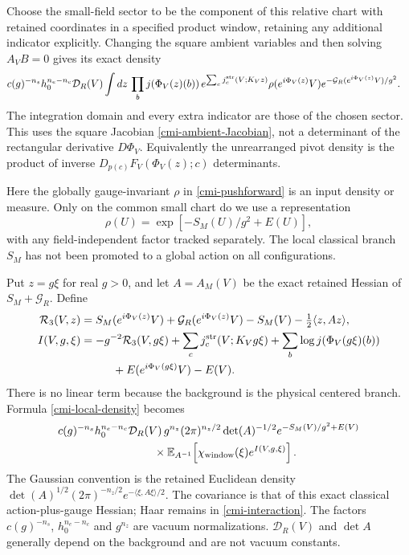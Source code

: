 \documentclass[11pt]{article}
\theoremstyle{remark}
\begin{document}
Choose the small-field sector to be the component of this
relative chart with retained coordinates in a specified product
window, retaining any additional indicator explicitly. Changing
the square ambient variables and then solving $A_VB=0$ gives
its exact density
\begin{align}
 &c(g)^{-n_s}h_0^{n_e-n_c}\mathcal D_R(V)
 \int dz\,
    \prod_bj(\Phi_V(z)(b))\,
    e^{\sum_cj_c^{\rm str}(V;K_Vz)}
    \rho(e^{i\Phi_V(z)}V)
    e^{-\mathcal G_R(e^{i\Phi_V(z)}V)/g^2}.
                                                        \label{cmi-local-density}
\end{align}
The integration domain and every extra indicator are those
of the chosen sector. This uses the square Jacobian
\eqref{cmi-ambient-Jacobian}, not a determinant of the
rectangular derivative $D\Phi_V$. Equivalently the unrearranged
pivot density is the product of inverse
$D_{p(c)}F_V(\Phi_V(z);c)$ determinants.

Here the globally gauge-invariant $\rho$ in
\eqref{cmi-pushforward} is an input density or measure.
Only on the common small chart do we use a representation
\[
 \rho(U)=\exp[-S_M(U)/g^2+E(U)],
\]
with any field-independent factor tracked separately.
The local classical branch $S_M$ has not been promoted
to a global action on all configurations.

Put $z=g\xi$ for real $g>0$, and let $A=A_M(V)$ be the exact
retained Hessian of $S_M+\mathcal G_R$. Define
\begin{align}
 \mathcal R_3(V,z)
   &=S_M(e^{i\Phi_V(z)}V)+\mathcal G_R(e^{i\Phi_V(z)}V)
            -S_M(V)-\tfrac12\langle z,Az\rangle,\notag\\
 I(V,g,\xi)
   &=-g^{-2}\mathcal R_3(V,g\xi)
      +\sum_cj_c^{\rm str}(V;K_Vg\xi)
      +\sum_b\log j(\Phi_V(g\xi)(b))\notag\\
   &\hspace{1cm}+E(e^{i\Phi_V(g\xi)}V)-E(V).
                                                        \label{cmi-interaction}
\end{align}
There is no linear term because the background is the physical
centered branch. Formula \eqref{cmi-local-density} becomes
\begin{align}
 &c(g)^{-n_s}h_0^{n_e-n_c}\mathcal D_R(V)\,
   g^{n_z}(2\pi)^{n_z/2}\det(A)^{-1/2}
   e^{-S_M(V)/g^2+E(V)}\notag\\
 &\hspace{3cm}\times
   \mathbb E_{A^{-1}}\!
      \left[\chi_{\rm window}(\xi)e^{I(V,g,\xi)}\right].
                                                        \label{cmi-Gaussian-integral}
\end{align}
The Gaussian convention is the retained Euclidean density
$\det(A)^{1/2}(2\pi)^{-n_z/2}
e^{-\langle\xi,A\xi\rangle/2}$.
The covariance is that of this exact classical
action-plus-gauge Hessian; Haar remains in
\eqref{cmi-interaction}. The factors $c(g)^{-n_s}$,
$h_0^{n_e-n_c}$ and $g^{n_z}$ are vacuum normalizations.
$\mathcal D_R(V)$ and $\det A$ generally depend on the
background and are not vacuum constants.
\end{document}
